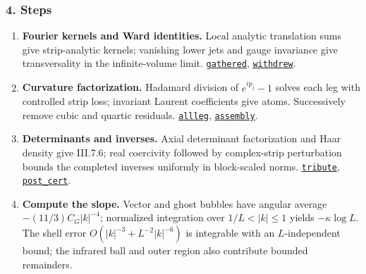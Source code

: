 \documentclass[
  letterpaper,
  11pt]{article}
\providecommand{\tightlist}{%
  \setlength{\itemsep}{0pt}\setlength{\parskip}{0pt}}
\begin{document}
\subsubsection{4. Steps}\label{steps-9}

\begin{enumerate}
\def\labelenumi{\arabic{enumi}.}
\tightlist
\item
  \textbf{Fourier kernels and Ward identities.} Local analytic
  translation sums give strip-analytic kernels; vanishing lower jets and
  gauge invariance give transversality in the infinite-volume limit.
  \href{https://github.com/yang-mills-group/OpenAI-YM-20261028/blob/3456e5e75cf8d4cd558955a5c7638fba2d68f464/YM/Next/STATIONARY/Shape/LocalOracle.lean\#L312-L348}{\texttt{gathered}},
  \href{https://github.com/yang-mills-group/OpenAI-YM-20261028/blob/3456e5e75cf8d4cd558955a5c7638fba2d68f464/YM/Next/STATIONARY/Lift/Ward.lean\#L647-L697}{\texttt{withdrew}}.
\item
  \textbf{Curvature factorization.} Hadamard division of \(e^{ip_j}-1\)
  solves each leg with controlled strip loss; invariant Laurent
  coefficients give atoms. Successively remove cubic and quartic
  residuals.
  \href{https://github.com/yang-mills-group/OpenAI-YM-20261028/blob/3456e5e75cf8d4cd558955a5c7638fba2d68f464/YM/Next/STATIONARY/Lift/ManyLegs.lean\#L533-L549}{\texttt{allleg}},
  \href{https://github.com/yang-mills-group/OpenAI-YM-20261028/blob/3456e5e75cf8d4cd558955a5c7638fba2d68f464/YM/Next/STATIONARY/Shape/ClassicalMatch.lean\#L561-L595}{\texttt{assembly}}.
\item
  \textbf{Determinants and inverses.} Axial determinant factorization
  and Haar density give III.7.6; real coercivity followed by
  complex-strip perturbation bounds the completed inverses uniformly in
  block-scaled norms.
  \href{https://github.com/yang-mills-group/OpenAI-YM-20261028/blob/3456e5e75cf8d4cd558955a5c7638fba2d68f464/YM/Next/STATIONARY/Joint/HaarJac.lean\#L177-L202}{\texttt{tribute}},
  \href{https://github.com/yang-mills-group/OpenAI-YM-20261028/blob/3456e5e75cf8d4cd558955a5c7638fba2d68f464/YM/Next/STATIONARY/Spectral/ComplexGap.lean\#L330-L353}{\texttt{post\_cert}}.
\item
  \textbf{Compute the slope.} Vector and ghost bubbles have angular
  average \(-(11/3)C_G|k|^{-4}\); normalized integration over
  \(1/L<|k|\le1\) yields \(-\kappa\log L\). The shell error
  \(O(|k|^{-3}+L^{-2}|k|^{-6})\) is integrable with an \(L\)-independent
  bound; the infrared ball and outer region also contribute bounded
  remainders.

\end{enumerate}
\end{document}
